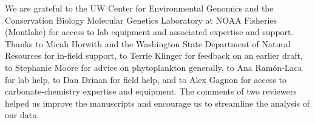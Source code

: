 \documentclass[11pt]{article}
\begin{document}
\begin{linenumbers}
 We are grateful to the UW Center for Environmental Genomics and the Conservation Biology Molecular Genetics Laboratory at NOAA Fisheries (Montlake) for access to lab equipment and associated expertise and support. Thanks to Micah Horwith and the Washington State Department of Natural Resources for in-field support, to Terrie Klinger for feedback on an earlier draft, to Stephanie Moore for advice on phytoplankton generally, to Ana Ram\'{o}n-Laca for lab help, to Dan Drinan for field help, and to Alex Gagnon for access to carbonate-chemistry expertise and equipment. The comments of two reviewers helped us improve the manuscripts and encourage us to streamline the analysis of our data.




 \end{linenumbers}
\end{document}

